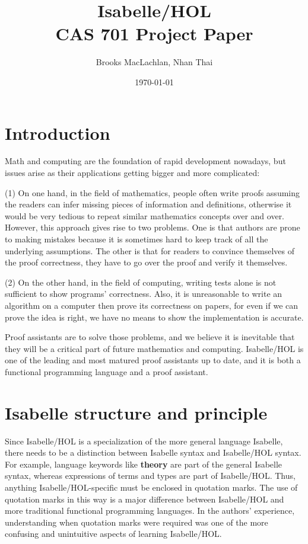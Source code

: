 \documentclass{article}
\title{Isabelle/HOL \\ \large CAS 701 Project Paper}
\author{Brooks MacLachlan, Nhan Thai}
\date{\today}
\begin{document}
	
\maketitle

\newpage
\section{Introduction}
Math and computing are the foundation of rapid development nowadays, but issues arise as their applications getting bigger and
more complicated:

(1) On one hand, in the field of mathematics, people often write proofs assuming
the readers can infer missing pieces of information and definitions,
otherwise it would be very tedious to repeat similar mathematics concepts
over and over. However, this approach gives rise to two problems. One is
that authors are prone to making mistakes because it is sometimes hard to
keep track of all the underlying assumptions. The other is that for readers
to convince themselves of the proof correctness, they have to go over the
proof and verify it themselves.

(2) On the other hand, in the field of computing, writing tests alone is not
sufficient to show programs' correctness.
Also, it is unreasonable to write an algorithm on a computer then prove its
correctness on papers, for even if we can prove the idea is right, we have
no means to show the implementation is accurate.


Proof assistants are to solve those problems,
and we believe it is inevitable that they will be a critical part of future mathematics and computing.
Isabelle/HOL is one of the leading and most matured proof assistants up to date, and
it is both a functional programming language and a proof assistant.


\section{Isabelle structure and principle}

Since Isabelle/HOL is a specialization of the more general language Isabelle,
there needs to be a distinction between Isabelle syntax and Isabelle/HOL
syntax. For example, language keywords like \textbf{theory} are part of the
general Isabelle syntax, whereas expressions of terms and types are part of
Isabelle/HOL. Thus, anything Isabelle/HOL-specific must be enclosed in
quotation marks. The use of quotation marks in this way is a major difference
between Isabelle/HOL and more traditional functional programming languages. In
the authors' experience, understanding when quotation marks were required was
one of the more confusing and unintuitive aspects of learning Isabelle/HOL.
\end{document}
